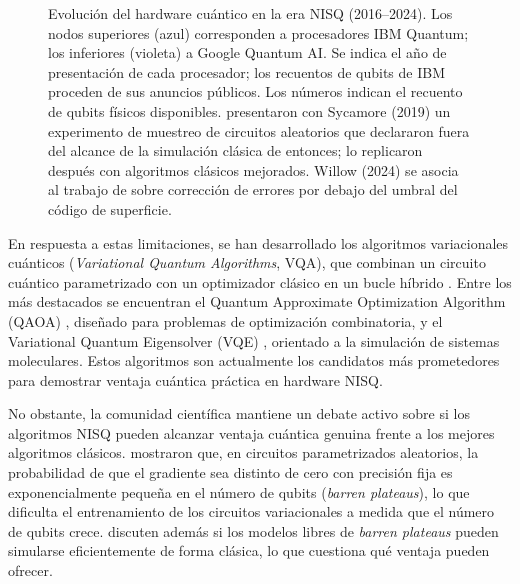 \begin{figure}[!htbp]
\caption[Evolución del hardware cuántico en la era NISQ (2016--2024)]{Evolución del hardware cuántico en la era NISQ (2016--2024). Los nodos superiores (azul) corresponden a procesadores IBM Quantum; los inferiores (violeta) a Google Quantum AI. Se indica el año de presentación de cada procesador; los recuentos de qubits de IBM proceden de sus anuncios públicos. Los números indican el recuento de qubits físicos disponibles. \citet{arute2019} presentaron con Sycamore (2019) un experimento de muestreo de circuitos aleatorios que declararon fuera del alcance de la simulación clásica de entonces; \citet{pan2022} lo replicaron después con algoritmos clásicos mejorados. Willow (2024) se asocia al trabajo de \citet{willow2025} sobre corrección de errores por debajo del umbral del código de superficie.}
\label{fig:timeline_hardware}
\end{figure}

En respuesta a estas limitaciones, se han desarrollado los algoritmos variacionales cuánticos (\textit{Variational Quantum Algorithms}, VQA), que combinan un circuito cuántico parametrizado con un optimizador clásico en un bucle híbrido \citep{cerezo2021}. Entre los más destacados se encuentran el Quantum Approximate Optimization Algorithm (QAOA) \citep{farhi2014}, diseñado para problemas de optimización combinatoria, y el Variational Quantum Eigensolver (VQE) \citep{peruzzo2014}, orientado a la simulación de sistemas moleculares. Estos algoritmos son actualmente los candidatos más prometedores para demostrar ventaja cuántica práctica en hardware NISQ.

No obstante, la comunidad científica mantiene un debate activo sobre si los algoritmos NISQ pueden alcanzar ventaja cuántica genuina frente a los mejores algoritmos clásicos. \cite{mcclean2018} mostraron que, en circuitos parametrizados aleatorios, la probabilidad de que el gradiente sea distinto de cero con precisión fija es exponencialmente pequeña en el número de qubits (\textit{barren plateaus}), lo que dificulta el entrenamiento de los circuitos variacionales a medida que el número de qubits crece. \cite{cerezo2023} discuten además si los modelos libres de \textit{barren plateaus} pueden simularse eficientemente de forma clásica, lo que cuestiona qué ventaja pueden ofrecer.


